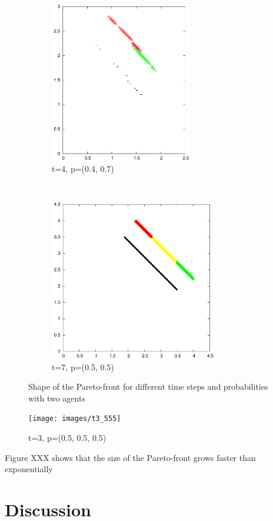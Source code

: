 \documentclass{article}
\begin{document}
\begin{figure}
		\begin{subfigure}[b]{0.45\textwidth}
			\centering
			\includegraphics[width=\textwidth,height=7cm,keepaspectratio]{images/t4_47}
			\caption{t=4, p=(0.4, 0.7)}
			\label{fig:t4_47}
		\end{subfigure}
		~
		\begin{subfigure}[b]{0.45\textwidth}
			\centering
			\includegraphics[width=\textwidth,height=7cm,keepaspectratio]{images/t7_55}
			\caption{t=7, p=(0.5, 0.5)}
			\label{fig:t7_55}
		\end{subfigure}
		\caption{Shape of the Pareto-front for different time steps and
		probabilities with two agents}
	\end{figure}

	\begin{figure}
		\centering
		\texttt{[image: images/t3\_555]}
		\label{fig:t3_555}
		\caption{t=3, p=(0.5, 0.5, 0.5)}
	\end{figure}

	Figure XXX shows that the size of the Pareto-front grows faster than
	exponentially
	\restoregeometry

	\section{Discussion}
	\label{sec:discussion}
\end{document}
